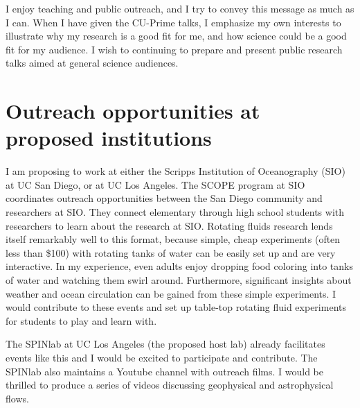 \documentclass[12pt]{article}
\begin{document}
I enjoy teaching and public outreach, and I try to convey this message as much as I can.
When I have given the CU-Prime talks, I emphasize my own interests to illustrate why my research is a good fit for me, and how science could be a good fit for my audience. I wish to continuing to prepare and present public research talks aimed at general science audiences.
\section*{Outreach opportunities at proposed institutions}
I am proposing to work at either the Scripps Institution of Oceanography (SIO) at UC San Diego, or at UC Los Angeles. The SCOPE program at SIO coordinates outreach opportunities between the San Diego community and researchers at SIO. They connect elementary through high school students with researchers to learn about the research at SIO. 
Rotating fluids research lends itself remarkably well to this format, because simple, cheap experiments (often less than \$100) with rotating tanks of water can be easily set up and are very interactive. In my experience, even adults enjoy dropping food coloring into tanks of water and watching them swirl around. Furthermore, significant insights about weather and ocean circulation can be gained from these simple  experiments. I would contribute to these events and set up table-top rotating fluid experiments for students to play and learn with.

The SPINlab at UC Los Angeles (the proposed host lab) already facilitates events like this and I would be excited to participate and contribute. The SPINlab also maintains a Youtube channel with outreach films. I would be thrilled to produce a series of videos discussing geophysical and astrophysical flows. 
\printbibliography
\end{document}
